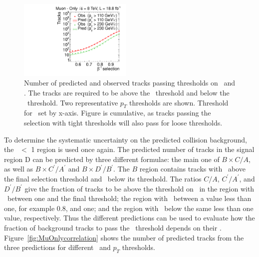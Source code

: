 \begin{figure}
\centering
  \includegraphics[clip=false, trim=0.0cm 0cm 0.0cm 0cm, width=0.48\textwidth]{figures/muonly/Prediction_Data8TeV_NPredVsNObs_Flip}
  \caption[Number of predicted and observed tracks in the \invbeta\ $<$ 1 region in the \muononly\ analysis]
{Number of predicted and observed tracks passing thresholds on \pt\ and \invbeta. The tracks are required to be above the \pt\ threshold and below the \invbeta\ threshold.
Two representative $p_T$ thresholds are shown. Threshold for \invbeta\ set by x-axis.
Figure is cumulative, as tracks passing the selection with tight thresholds will also pass for loose thresholds.}
    \label{fig:PredFlipPt230}
\end{figure}

To determine the systematic uncertainty on the predicted collision background, the \invbeta\ $<$ 1 region is used once again. The predicted number of tracks
in the signal region D can be predicted by three different formulae: the main one of $B \times C/A$, as well as 
$B \times C^{\prime}/A^{\prime}$ and $B \times D^{\prime}/B^{\prime}$. The $B$ region contains tracks with \invbeta\ above the final selection threshold and
\pt\ below its threshold. The ratios $C/A$, $C^{\prime}/A^{\prime}$, and $D^{\prime}/B^{\prime}$ give the fraction of tracks to be above the threshold on \pt\
in the region with \invbeta\ between one and the final threshold; the region with \invbeta\ between a value less than one, for example 0.8, and one;
and the region with \invbeta\ below
the same less than one value, respectively. Thus the different predictions can be used to evaluate how the fraction of background tracks to pass the \pt\ threshold depends on
their \invbeta.
Figure~\ref{fig:MuOnlycorrelation} shows the number of predicted tracks from the three predictions for different \invbeta\ and $p_T$ thresholds.

